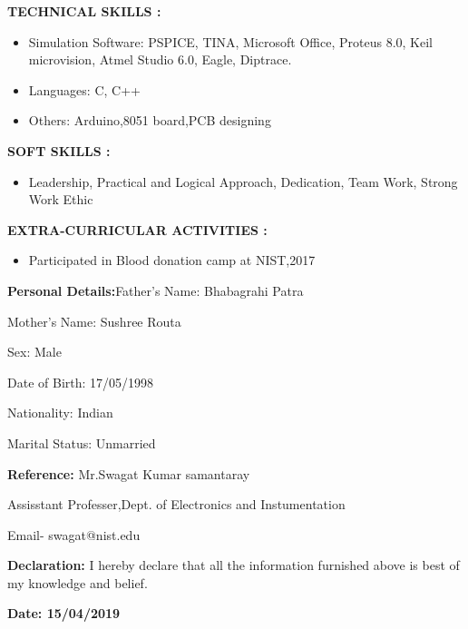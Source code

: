 \documentclass[a4]{article}
\begin{document}
\vspace{3mm}
\textbf{TECHNICAL SKILLS : } 
\begin{itemize}
	\item Simulation Software: PSPICE, TINA, Microsoft Office, Proteus 8.0, Keil microvision, Atmel Studio 6.0, Eagle, Diptrace.
	\item Languages: C, C++
        \item Others: Arduino,8051 board,PCB designing

\end{itemize}

\vspace{3mm}
\textbf{SOFT SKILLS : } 
\begin{itemize}
	\item  Leadership,  Practical  and Logical Approach, Dedication, Team Work, Strong Work Ethic

\end{itemize}

\vspace{3mm}
\textbf{EXTRA-CURRICULAR ACTIVITIES : } 
\begin{itemize}
	\item Participated in Blood donation camp at NIST,2017
\end{itemize}

\vspace{3mm}
\textbf{Personal Details:}\hspace{.4cm}Father's Name: Bhabagrahi Patra

\hspace{3.4cm}Mother's Name: Sushree Routa

\hspace{3.4cm}Sex: Male

\hspace{3.4cm}Date of Birth: 17/05/1998

\hspace{3.4cm}Nationality: Indian

\hspace{3.4cm}Marital Status: Unmarried

\vspace{3mm}
\textbf{Reference: }
\hspace{1cm} Mr.Swagat Kumar samantaray

\hspace{3.4cm}Assisstant Professer,Dept. of Electronics and Instumentation

\hspace{3.4cm}Email- swagat@nist.edu

\vspace{3mm}
\textbf{Declaration: }I hereby declare that all the information furnished above is best of my knowledge and belief.

\vspace{3mm}
\textbf{Date: 15/04/2019}
\end{document}
